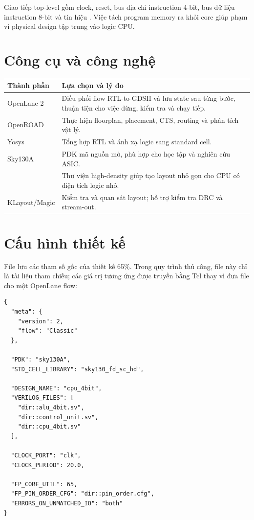 \documentclass[12pt,a4paper]{article}
\newcommand{\code}[1]{\texttt{\detokenize{#1}}}
\begin{document}
Giao tiếp top-level gồm clock, reset, bus địa chỉ instruction 4-bit, bus dữ
liệu instruction 8-bit và tín hiệu \code{halted}. Việc tách program memory
ra khỏi core giúp phạm vi physical design tập trung vào logic CPU.

\section{Công cụ và công nghệ}

\begin{longtable}{>{\raggedright\arraybackslash}p{}
                  >{\raggedright\arraybackslash}p{}}
\toprule
\textbf{Thành phần} & \textbf{Lựa chọn và lý do} \\
\midrule
\endhead
OpenLane 2 & Điều phối flow RTL-to-GDSII và lưu state sau từng bước, thuận
tiện cho việc dừng, kiểm tra và chạy tiếp. \\
OpenROAD & Thực hiện floorplan, placement, CTS, routing và phân tích vật lý. \\
Yosys & Tổng hợp RTL và ánh xạ logic sang standard cell. \\
Sky130A & PDK mã nguồn mở, phù hợp cho học tập và nghiên cứu ASIC. \\
\code{sky130_fd_sc_hd} & Thư viện high-density giúp tạo layout nhỏ gọn cho
CPU có diện tích logic nhỏ. \\
KLayout/Magic & Kiểm tra và quan sát layout; hỗ trợ kiểm tra DRC và stream-out. \\
\bottomrule
\end{longtable}

\section{Cấu hình thiết kế}

File \code{config_util65.json} lưu các tham số gốc của thiết kế 65\%.
Trong quy trình thủ công, file này chỉ là tài liệu tham chiếu; các giá trị
tương ứng được truyền bằng Tcl thay vì đưa file cho một OpenLane flow:

\begin{lstlisting}[language={},caption={Cấu hình OpenLane 2}]
{
  "meta": {
    "version": 2,
    "flow": "Classic"
  },

  "PDK": "sky130A",
  "STD_CELL_LIBRARY": "sky130_fd_sc_hd",

  "DESIGN_NAME": "cpu_4bit",
  "VERILOG_FILES": [
    "dir::alu_4bit.sv",
    "dir::control_unit.sv",
    "dir::cpu_4bit.sv"
  ],

  "CLOCK_PORT": "clk",
  "CLOCK_PERIOD": 20.0,

  "FP_CORE_UTIL": 65,
  "FP_PIN_ORDER_CFG": "dir::pin_order.cfg",
  "ERRORS_ON_UNMATCHED_IO": "both"
}
\end{lstlisting}
\end{document}
